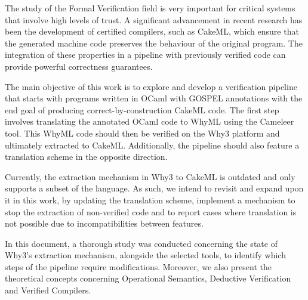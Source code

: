 
%

The study of the Formal Verification field is very important for critical systems that
involve high levels of trust. A significant advancement in recent research has been the
development of certified compilers, such as CakeML, which ensure that the generated 
machine code preserves the behaviour of the original program. The integration of these 
properties in a pipeline with previously verified code can provide powerful correctness
guarantees. 

The main objective of this work is to explore and develop a verification pipeline 
that starts with programs written in OCaml with GOSPEL annotations with the end goal of
producing correct-by-construction CakeML code. The first step involves translating the
annotated OCaml code to WhyML using the Cameleer tool. This WhyML code should then be 
verified on the Why3 platform and ultimately extracted to CakeML. Additionally, the 
pipeline should also feature a translation scheme in the opposite direction.

Currently, the extraction mechanism in Why3 to CakeML is outdated and only supports
a subset of the language. As such, we intend to revisit and expand upon it in this 
work, by updating the translation scheme, implement a mechanism to stop the extraction
of non-verified code and to report cases where translation is not possible due to 
incompatibilities between features.

In this document, a thorough study was conducted concerning the state of Why3's
extraction mechanism, alongside the selected tools, to identify which steps of the 
pipeline require modifications. Moreover, we also present the theoretical 
concepts concerning Operational Semantics, Deductive Verification and Verified 
Compilers.



